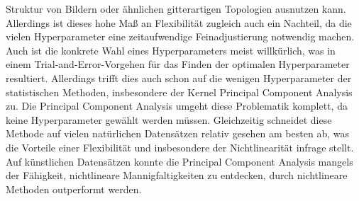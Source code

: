 Struktur von Bildern oder ähnlichen gitterartigen Topologien ausnutzen kann. Allerdings ist dieses
hohe Maß an Flexibilität zugleich auch ein Nachteil, da die vielen Hyperparameter eine
zeitaufwendige Feinadjustierung notwendig machen. Auch ist die konkrete Wahl eines Hyperparameters
meist willkürlich, was in einem Trial-and-Error-Vorgehen für das Finden der optimalen
Hyperparameter resultiert. Allerdings trifft dies auch schon auf die wenigen Hyperparameter der
statistischen Methoden, insbesondere der Kernel Principal Component Analysis zu. Die Principal
Component Analysis umgeht diese Problematik komplett, da keine Hyperparameter gewählt werden
müssen. Gleichzeitig schneidet diese Methode auf vielen natürlichen Datensätzen relativ gesehen am
besten ab, was die Vorteile einer Flexibilität und insbesondere der Nichtlinearität infrage stellt.
Auf künstlichen Datensätzen konnte die Principal Component Analysis mangels der Fähigkeit,
nichtlineare Mannigfaltigkeiten zu entdecken, durch nichtlineare Methoden outperformt werden.


